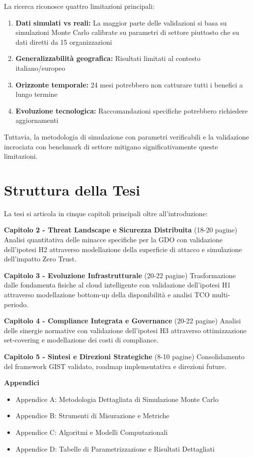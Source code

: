 La ricerca riconosce quattro limitazioni principali:
\begin{enumerate}
\item \textbf{Dati simulati vs reali:} La maggior parte delle validazioni si basa su simulazioni Monte Carlo calibrate su parametri di settore piuttosto che su dati diretti da 15 organizzazioni
\item \textbf{Generalizzabilità geografica:} Risultati limitati al contesto italiano/europeo
\item \textbf{Orizzonte temporale:} 24 mesi potrebbero non catturare tutti i benefici a lungo termine
\item \textbf{Evoluzione tecnologica:} Raccomandazioni specifiche potrebbero richiedere aggiornamenti
\end{enumerate}

Tuttavia, la metodologia di simulazione con parametri verificabili e la validazione incrociata con benchmark di settore mitigano significativamente queste limitazioni.

\section{Struttura della Tesi}

La tesi si articola in cinque capitoli principali oltre all'introduzione:

\textbf{Capitolo 2 - Threat Landscape e Sicurezza Distribuita} (18-20 pagine) Analisi quantitativa delle minacce specifiche per la GDO con validazione dell'ipotesi H2 attraverso modellazione della superficie di attacco e simulazione dell'impatto Zero Trust.

\textbf{Capitolo 3 - Evoluzione Infrastrutturale} (20-22 pagine) Trasformazione dalle fondamenta fisiche al cloud intelligente con validazione dell'ipotesi H1 attraverso modellazione bottom-up della disponibilità e analisi TCO multi-periodo.

\textbf{Capitolo 4 - Compliance Integrata e Governance} (20-22 pagine) Analisi delle sinergie normative con validazione dell'ipotesi H3 attraverso ottimizzazione set-covering e modellazione dei costi di compliance.

\textbf{Capitolo 5 - Sintesi e Direzioni Strategiche} (8-10 pagine) Consolidamento del framework GIST validato, roadmap implementativa e direzioni future.

\textbf{Appendici}
\begin{itemize}
\item Appendice A: Metodologia Dettagliata di Simulazione Monte Carlo
\item Appendice B: Strumenti di Misurazione e Metriche
\item Appendice C: Algoritmi e Modelli Computazionali
\item Appendice D: Tabelle di Parametrizzazione e Risultati Dettagliati
\end{itemize}

